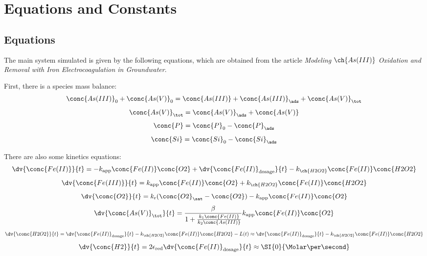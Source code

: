 \documentclass[11pt]{scrartcl} %
\begin{document}
    \section{Equations and Constants}

    \subsection{Equations}

    The main system simulated is given by the following equations, which are obtained from the article \textit{Modeling} $\ch{As (III)}$ \textit{Oxidation and Removal with Iron Electrocoagulation in Groundwater}.

    First, there is a species mass balance:
    \begin{equation}
        \conc{As (III)}_0 + \conc{As (V)}_0 = \conc{As (III)} + \conc{As (III)}_\ads + \conc{As (V)}_{\tot}
    \end{equation}
    \begin{equation}
        \conc{As (V)}_\tot = \conc{As (V)}_\ads + \conc{As (V)}
    \end{equation}
    \begin{equation}
        \conc{P} = \conc{P}_0 - \conc{P}_\ads
    \end{equation}
    \begin{equation}
        \conc{Si} = \conc{Si}_0 - \conc{Si}_\ads
    \end{equation}

    There are also some kinetics equations:
    \begin{equation}
        \dv{\conc{Fe(II)}}{t} = -k_{\mathrm{app}}\conc{Fe(II)}\conc{O2} + \dv{\conc{Fe (II)}_{\mathrm{dosage}}}{t} - k_{\ch{H2O2}}\conc{Fe(II)}\conc{H2O2}
    \end{equation}
    \begin{equation}
        \dv{\conc{Fe (III)}}{t} = k_{\mathrm{app}}\conc{Fe (II)}\conc{O2} + k_{\ch{H2O2}}\conc{Fe(II)}\conc{H2O2}
    \end{equation}
    \begin{equation}
        \dv{\conc{O2}}{t} = k_{\mathrm{r}}(\conc{O2}_{\sat} - \conc{O2}) - k_{\mathrm{app}}\conc{Fe (II)}\conc{O2}
    \end{equation}
    \begin{equation}
        \dv{\conc{As  (V)}_\tot}{t} = \frac{\beta}{1 + \frac{k_1\conc{Fe (II)}}{k_2\conc{As (III)}}}k_{\mathrm{app}}\conc{Fe (II)}\conc{O2}
    \end{equation}
    \begin{equation}
        \dv{\conc{H2O2}}{t} = \dv{\conc{Fe(II)}_{\mathrm{dosage}}}{t} - k_{\ch{H2O2}}\conc{Fe(II)}\conc{H2O2} - L(t) \approx \dv{\conc{Fe(II)}_{\mathrm{dosage}}}{t} - k_{\ch{H2O2}}\conc{Fe(II)}\conc{H2O2}
    \end{equation}
    \begin{equation}
        \dv{\conc{H2}}{t} = 2\epsilon_{\mathrm{red}}\dv{\conc{Fe (II)}_{\mathrm{dosage}}}{t} \approx \SI{0}{\Molar\per\second}
    \end{equation}
\end{document}
